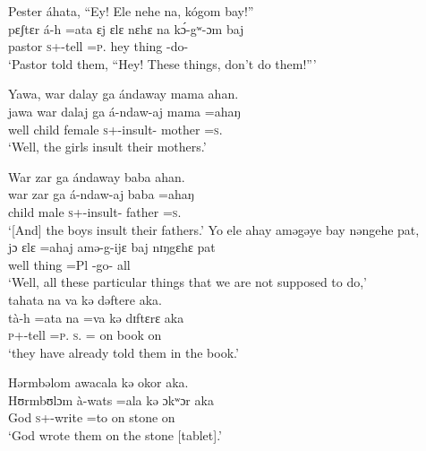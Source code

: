  \medskip
 Pester  áhata,  “Ey!  Ele  nehe  na,  kógom  bay!”  \\
\gll pɛʃtɛr  á-h    =ata   ɛj     ɛlɛ      nɛhɛ   na k\'ɔ-gʷ-ɔm baj\\
 pastor  \textsc{s}+{\IFV}-tell  =\textsc{p}.{\IO}  hey  thing  {\DEM}  {\PSP} {\IFV}-do-{\twoP}  {\NEG}\\
 \glt ‘Pastor told them, “Hey! These things, don’t do them!”’
 \z

\ea Yawa,  war  dalay  ga ándaway  mama  ahan.\\
 \gll jawa   war   dalaj  ga  á-ndaw-aj   mama   =ahaŋ\\
 well    child  female  {\ADJ}  \textsc{s}+{\IFV}-insult{}-{\CL}  mother  =\textsc{s}.{\POSS}\\
 \glt ‘Well, the girls insult their mothers.’ 
 \z

\ea War  zar  ga  ándaway  baba  ahan.\\
 \gll war     zar  ga  á-ndaw-aj   baba   =ahaŋ\\
 child  male  {\ADJ}  \textsc{s}+{\IFV}-insult{}-{\CL}  father  =\textsc{s}.{\POSS}\\
 \glt ‘[And] the boys insult their fathers.’ 
 \z
\clearpage
\ea Yo  ele  ahay  aməgəye  bay  nəngehe    pat,\\
 \gll jɔ      ɛlɛ   =ahaj  amə-g-ijɛ   baj      nɪŋgɛhɛ    pat\\
 well   thing  =Pl      {\DEP}-go-{\CL}    {\NEG}    {\DEM}     all\\
 \glt ‘Well, all these particular things that we are not supposed to do,’\\
 
 \medskip
  tahata  na  va  kə  dəftere  aka.\\
 \gll tà-h    =ata     na        =va   kə   dɪftɛrɛ  aka\\
 \textsc{p}+{\PFV}-tell  =\textsc{p}.{\IO}   \textsc{s}.{\DO}    ={\PRF}  on  book  on\\
 \glt ‘they have already told them in the book.’
 \z

\ea Hərmbəlom  awacala  kə  okor  aka.\\
 \gll Hʊrmbʊlɔm   à-wats    =ala   kə   ɔkʷɔr   aka\\
 God    \textsc{s}+{\PFV}-write  =to  on  stone  on\\
 \glt ‘God wrote them on the stone [tablet].’
 \z

